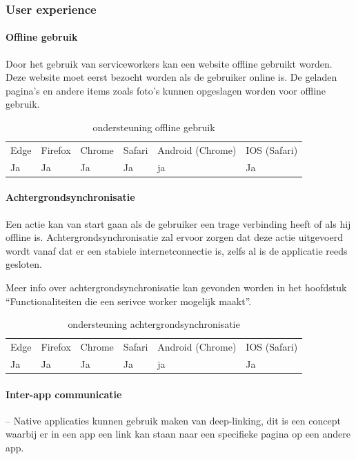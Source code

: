 \subsubsection{User experience}

\paragraph{Offline gebruik}
Door het gebruik van serviceworkers kan een website offline gebruikt worden. Deze website moet eerst bezocht worden als de gebruiker online is. De geladen pagina’s en andere items zoals foto’s kunnen opgeslagen worden voor offline gebruik.

\begin{table}[H]
	\begin{tabular}{llllll}
		Edge & Firefox & Chrome & Safari & Android (Chrome) & IOS (Safari) \\
		Ja   & Ja      &  Ja     & Ja     & ja               & Ja          
	\end{tabular}	
	\caption{ondersteuning offline gebruik}
\end{table}	



\paragraph{Achtergrondsynchronisatie }

Een actie kan van start gaan als de gebruiker een trage verbinding heeft of als hij offline is. Achtergrondsynchronisatie zal ervoor zorgen dat deze actie uitgevoerd wordt vanaf dat er een stabiele internetconnectie is, zelfs al is de applicatie reeds gesloten.

Meer info over achtergrondsynchronisatie kan gevonden worden in het hoofdstuk “Functionaliteiten die een serivce worker mogelijk maakt”.


\begin{table}[H]
	\centering
	\begin{tabular}{llllll}
		Edge & Firefox & Chrome & Safari & Android (Chrome) & IOS (Safari) \\
		Ja   & Ja      &  Ja     & Ja     & ja               & Ja          
	\end{tabular}	
	\caption{ondersteuning achtergrondsynchronisatie}
\end{table}


\paragraph{Inter-app communicatie}
– Native applicaties kunnen gebruik maken van deep-linking, dit is een concept waarbij er in een app een link kan staan naar een specifieke pagina op een andere app.

